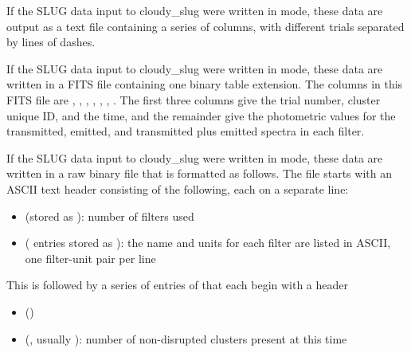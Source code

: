 \documentclass[letterpaper,10pt,english]{sphinxmanual}
\begin{document}
If the SLUG data input to cloudy\_slug were written in  mode,
these data are output as a text file containing a series of columns,
with different trials separated by lines of dashes.

If the SLUG data input to cloudy\_slug were written in  mode,
these data are written in a FITS file containing one binary table
extension. The columns in this FITS file are , ,
, , ,
, . The first three columns
give the trial number, cluster unique ID, and the time, and the
remainder give the photometric values for the transmitted, emitted,
and transmitted plus emitted spectra in each filter.

If the SLUG data input to cloudy\_slug were written in  mode,
these data are written in a raw binary file that is formatted as
follows. The file starts with an ASCII text header consisting of the
following, each on a separate line:
\begin{itemize}
\item {} 
 (stored as ): number of filters used

\item {} 
  ( entries stored as ): the name and units for each filter are listed in ASCII, one
filter-unit pair per line

\end{itemize}

This is followed by a series of entries of that each begin with a
header
\begin{itemize}
\item {} 
 ()

\item {} 
 (, usually ): number of non-disrupted clusters present at this time

\end{itemize}
\end{document}
